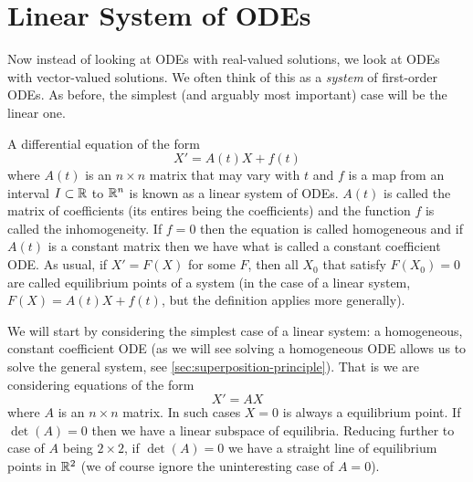 \section{Linear System of ODEs}
Now instead of looking at ODEs with real-valued solutions, we look at ODEs with vector-valued solutions. We often think of this as a \textit{system} of first-order ODEs. As before, the simplest (and arguably most important) case will be the linear one. 

A differential equation of the form
$$ X' = A(t) X + f(t) $$
where $A(t)$ is an $n \times n$ matrix that may vary with $t$ and $f$ is a map from an interval $I \subset \mathbb{R}$ to $\mathbb{R}^n$ is known as a linear system of ODEs. $A(t)$ is called the matrix of coefficients (its entires being the coefficients) and the function $f$ is called the inhomogeneity. If $f = 0$ then the equation is called homogeneous and if $A(t)$ is a constant matrix then we have what is called a constant coefficient ODE. As usual, if $X' = F(X)$ for some $F$, then all $X_0$ that satisfy $F(X_0) = 0$ are called equilibrium points of a system (in the case of a linear system, $F(X) = A(t) X + f(t)$, but the definition applies more generally). 

We will start by considering the simplest case of a linear system: a homogeneous, constant coefficient ODE (as we will see solving a homogeneous ODE allows us to solve the general system, see \autoref{sec:superposition-principle}). That is we are considering equations of the form
$$X' = AX$$
where $A$ is an $n \times n$ matrix. In such cases $X = 0$ is always a equilibrium point. If $\det(A) = 0$ then we have a linear subspace of equilibria. Reducing further to case of $A$ being $2 \times 2$, if $\det(A) = 0$ we have a straight line of equilibrium points in $\mathbb{R}^2$ (we of course ignore the uninteresting case of $A = 0$).\\


